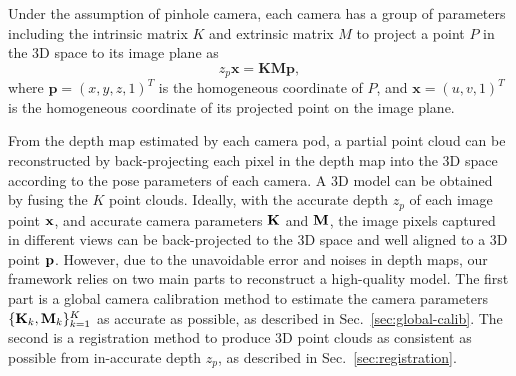 %
Under the assumption of pinhole camera, each camera has a group of parameters including the intrinsic matrix $K$ and extrinsic matrix $M$ to project a point $P$ in the 3D space to its image plane as
\begin{equation}\label{eq:cam-proj}
z_{p}\mathbf{x}=\mathbf{K}\mathbf{M}\mathbf{p},
\end{equation}
where $\mathbf{p}=(x,y,z,1)^{T}$ is the homogeneous coordinate of $P$, and $\mathbf{x}=(u,v,1)^{T}$ is the homogeneous coordinate of its projected point on the image plane.
%


From the depth map estimated by each camera pod, a partial point cloud can be reconstructed by back-projecting each pixel in the depth map into the 3D space according to the pose parameters of each camera.
%
A 3D model can be obtained by fusing the $K$ point clouds.
%
%
Ideally, with the accurate depth $z_p$ of each image point $\mathbf{x}$, and accurate camera parameters $\mathbf{K}$ and $\mathbf{M}$, the image pixels captured in different views can be back-projected to the 3D space and well aligned to a 3D point $\mathbf{p}$.
%
However, due to the unavoidable error and noises in depth maps, our framework relies on two main parts to reconstruct a high-quality model.
%
The first part is a global camera calibration method to estimate the camera parameters $\{\mathbf{K}_k, \mathbf{M}_k\}^{K}_{k=1}$ as accurate as possible, as described in Sec.~\ref{sec:global-calib}.
The second is a registration method to produce 3D point clouds as consistent as possible from in-accurate depth $z_p$, as described in Sec.~\ref{sec:registration}.




 
